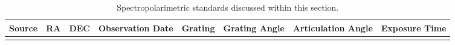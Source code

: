 \begin{table}[t]
    \centering
    \begin{tabular}{cccccccc}
        Source & RA                & DEC               & Observation Date & Grating & Grating Angle & Articulation Angle & Exposure Time \\ \hline
               &                   &                   &                  &         &               &                    &               \\ \hline
    \end{tabular}
    \caption{Spectropolarimetric standards discussed within this section.}
    \label{table:specpol_stds}
\end{table}
